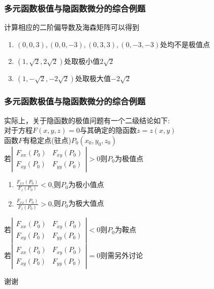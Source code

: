 \documentclass[xetex]{beamer}
\begin{document}
\begin{frame}
	\frametitle{多元函数极值与隐函数微分的综合例题}
	
	计算相应的二阶偏导数及海森矩阵可以得到\\
	\begin{enumerate}
		\item $(0,0,3),(0,0,-3),(0,3,3),(0,-3,-3)$处均不是极值点\\\pause
		\item $(1,\sqrt{2},2\sqrt{2})$处取极小值$2\sqrt{2}$\\\pause
		\item $(1,-\sqrt{2},-2\sqrt{2})$处取极大值$-2\sqrt{2}$
	\end{enumerate}

\end{frame}

\begin{frame}
	\frametitle{多元函数极值与隐函数微分的综合例题}
		实际上，关于隐函数的极值问题有一个二级结论如下:\\\pause
	对于方程$F(x,y,z)=0$与其确定的隐函数$z=z(x,y)$\\
	函数$F$有稳定点(驻点)$P_0(x_0,y_0,z_0)$\\\pause
	若$\left|
	\begin{matrix}
	F_{xx}(P_0)&F_{xy}(P_0)\\
	F_{xy}(P_0)&F_{yy}(P_0)
	\end{matrix}
	\right|>0$则$P_0$为极值点\\\pause
	\begin{enumerate}
		\item $\frac{F_{xx}(P_0)}{F_z(P_0)}<0$,则$P_0$为极小值点\pause
		\item $\frac{F_{xx}(P_0)}{F_z(P_0)}>0$,则$P_0$为极大值点\pause
	\end{enumerate}
	若$\left|
	\begin{matrix}
	F_{xx}(P_0)&F_{xy}(P_0)\\
	F_{xy}(P_0)&F_{yy}(P_0)
	\end{matrix}
	\right|<0$则$P_0$为鞍点\\\pause
	若$\left|
	\begin{matrix}
	F_{xx}(P_0)&F_{xy}(P_0)\\
	F_{xy}(P_0)&F_{yy}(P_0)
	\end{matrix}
	\right|=0$则需另外讨论\\\pause
\end{frame}

\begin{frame}[standout]
	谢谢
\end{frame}
\end{document}
